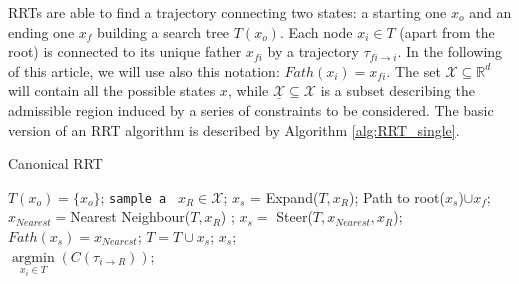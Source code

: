 RRTs are able to find a trajectory connecting two states: a starting one $x_o$ and an ending one $x_f$ building a search tree $T(x_o)$.
Each node $x_i \in T$ (apart from the root) is connected to its unique father $x_{fi}$ by a trajectory $\tau_{fi \rightarrow i}$. In the following of this article, we will use also this notation: $Fath(x_i)=x_{fi}$.
The set $\mathcal{X} \subseteq \mathbb{R}^{d} $ will contain all the possible states $x$, while $\underline{\mathcal{X}} \subseteq \mathcal{X}$ is a subset describing the admissible region induced by a series of constraints to be considered. 
The basic version of an RRT algorithm is described by Algorithm \ref{alg:RRT_single}.

\begin{algorithm}
\caption{Canonical RRT}\label{alg:RRT_single}
\begin{algorithmic}[1]
\State $T(x_o)= \lbrace x_o \rbrace$; 
	\State \texttt{sample a}\,\,\, $x_R \in  \mathcal{X}$; 
	\State $x_s$ = Expand($T , x_R$);
		\State \Return Path to root($x_s$)$ \cup x_f$;	
	\EndIf
\EndFor
\EndProcedure
\\
\State $x_{Nearest}=$Nearest Neighbour($T, x_R$) ;
\State $x_s=$ Steer($T, x_{Nearest}, x_R$);
\State $Fath(x_s)=x_{Nearest}$;
\State $T = T \cup x_s$;
\EndIf
\Return $x_s$;
\EndProcedure
\\
\State \Return $\underset{x_i \in T}{\operatorname{argmin}}( C(\tau_{i \rightarrow R } ) )$;
\EndProcedure
\end{algorithmic}
\end{algorithm}

